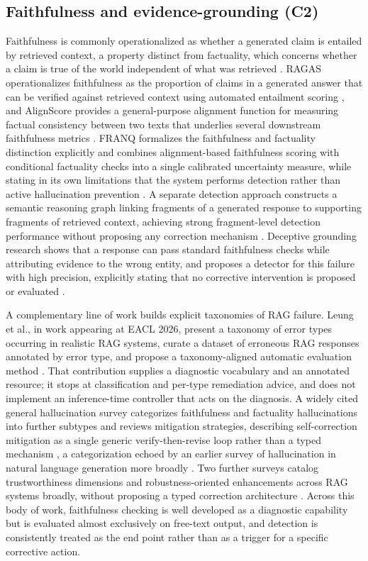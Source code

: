 \documentclass[10pt,twocolumn,letterpaper]{article}
\begin{document}
\subsection{Faithfulness and evidence-grounding (C2)}

Faithfulness is commonly operationalized as whether a generated claim is entailed by retrieved context, a property distinct from factuality, which concerns whether a claim is true of the world independent of what was retrieved \cite{franq}. RAGAS operationalizes faithfulness as the proportion of claims in a generated answer that can be verified against retrieved context using automated entailment scoring \cite{ragas}, and AlignScore provides a general-purpose alignment function for measuring factual consistency between two texts that underlies several downstream faithfulness metrics \cite{alignscore}. FRANQ formalizes the faithfulness and factuality distinction explicitly and combines alignment-based faithfulness scoring with conditional factuality checks into a single calibrated uncertainty measure, while stating in its own limitations that the system performs detection rather than active hallucination prevention \cite{franq}. A separate detection approach constructs a semantic reasoning graph linking fragments of a generated response to supporting fragments of retrieved context, achieving strong fragment-level detection performance without proposing any correction mechanism \cite{sirg}. Deceptive grounding research shows that a response can pass standard faithfulness checks while attributing evidence to the wrong entity, and proposes a detector for this failure with high precision, explicitly stating that no corrective intervention is proposed or evaluated \cite{deceptive}.

A complementary line of work builds explicit taxonomies of RAG failure. Leung et al., in work appearing at EACL 2026, present a taxonomy of error types occurring in realistic RAG systems, curate a dataset of erroneous RAG responses annotated by error type, and propose a taxonomy-aligned automatic evaluation method \cite{ragerrors}. That contribution supplies a diagnostic vocabulary and an annotated resource; it stops at classification and per-type remediation advice, and does not implement an inference-time controller that acts on the diagnosis. A widely cited general hallucination survey categorizes faithfulness and factuality hallucinations into further subtypes and reviews mitigation strategies, describing self-correction mitigation as a single generic verify-then-revise loop rather than a typed mechanism \cite{hallsurvey}, a categorization echoed by an earlier survey of hallucination in natural language generation more broadly \cite{jisurvey}. Two further surveys catalog trustworthiness dimensions and robustness-oriented enhancements across RAG systems broadly, without proposing a typed correction architecture \cite{trustsurvey,archsurvey}. Across this body of work, faithfulness checking is well developed as a diagnostic capability but is evaluated almost exclusively on free-text output, and detection is consistently treated as the end point rather than as a trigger for a specific corrective action.
\end{document}

